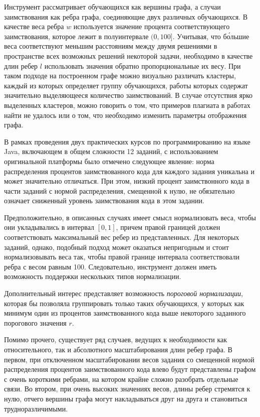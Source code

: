 \documentclass{article}
\begin{document}
Инструмент рассматривает обучающихся как вершины графа, а случаи заимствования как ребра графа, соединяющие двух различных обучающихся. В качестве веса ребра $w$ используется значение процента соответствующего заимствования, которое лежит в полуинтервале $(0,100]$. Учитывая, что б\'{о}льшие веса соответствуют меньшим расстояниям между двумя решениями в пространстве всех возможных решений некоторой задачи, необходимо в качестве длин ребер $l$ использовать значения обратно пропорциональные их весу. При таком подходе на построенном графе можно визуально различать кластеры, каждый из которых определяет группу обучающихся, работы которых содержат значительно выделяющееся количество заимствований. В случае отсутствия ярко выделенных кластеров, можно говорить о том, что примеров плагиата в работах найти не удалось или о том, что необходимо изменить параметры отображения графа.

В рамках проведения двух практических курсов по программированию на языке Java, включающем в общем сложности 12 заданий, с использованием оригинальной платформы было отмечено следующее явление: норма распределения процентов заимствованного кода для каждого задания уникальна и может значительно отличаться. При этом, низкий процент заимствонного кода в части заданий с нормой распределения, смещенной к нулю, не обязательно означает сниженный уровень заимствования кода в этом задании. 

Предположительно, в описанных случаях имеет смысл нормализовать веса, чтобы они укладывались в интервал $[0, 1]$, причем правой границей должен соответствовать максимальный вес ребер из представленных. Для некоторых заданий, однако, подобный подход может оказаться непригодным и стоит нормализовывать веса так, чтобы правой границе интервала соответствовали ребра с весом равным 100. Следовательно, инструмент должен иметь возможность поддержки нескольких типов нормализации.

Дополнительный интерес представляет возможность \textit{пороговой нормализации}, которая бы позволяла группировать только таких обучающихся, у которых как минимум один из процентов заимствованного кода выше некоторого заданного порогового значения $r$.

Помимо прочего, существует ряд случаев, ведущих к необходимости как относительного, так и абсолютного масштабирования длин ребер графа. В первом, при отключенном масштабировании весов задания со смещенной нормой распределения процентов заимствованного кода влево будут представлены графом с очень короткими ребрами, на котором крайне сложно разобрать отдельные связи. Во втором, при очень высоких значениях весов, длины ребер стремятся к нулю, отчего вершины графа могут накладываться друг на друга и становиться трудноразличимыми.
\end{document}
